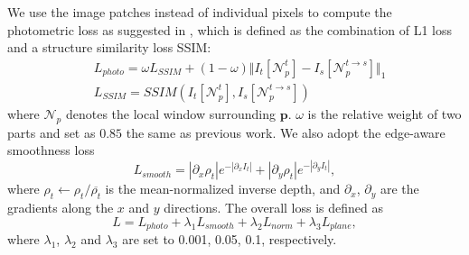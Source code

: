 \documentclass[10pt,twocolumn,letterpaper]{article}
\newcommand{\bv}[1]{{\bm {#1}}}
\newcommand{\beq}{\begin{equation}}
\newcommand{\eeq}{\end{equation}}
\begin{document}
We use the image patches instead of individual pixels to compute the photometric loss as suggested in \cite{yu2020p}, which is defined as the combination of L1 loss and a structure similarity loss SSIM\cite{SSIM}:
\beq
\begin{aligned}
	&L_{photo} = \omega L_{SSIM} + (1-\omega) \Vert I_{t}[\mathcal{N}_{p}^{t}]-I_{s}[\mathcal{N}_{p}^{t\rightarrow s}] \Vert_{1} \\
	&L_{SSIM} = SSIM(I_{t}[\mathcal{N}_{p}^{t}],I_{s}[\mathcal{N}_{p}^{t\rightarrow s}]) 
\end{aligned}
\eeq where $\mathcal{N}_{p}$ denotes the local window surrounding $\bv{p}$. $\omega$ is the relative weight of two parts and set as $0.85$ the same as previous work\cite{godard2019digging}. We also adopt the edge-aware smoothness loss
\beq
L_{smooth} = \left|\partial_x \rho_{t} \right|e^{-\left|\partial_x I_t\right|} +
\left|\partial_y \rho_{t} \right|e^{-\left|\partial_y I_t\right|},
\eeq where $\rho_{t} \leftarrow \rho_{t} / \overline{\rho_{t}}$ is the mean-normalized inverse depth, 
and $\partial_x$, $\partial_y$ are the gradients along the $x$ and $y$ directions. 
The overall loss is defined as
\beq
L = L_{photo} + \lambda_1 L_{smooth} + \lambda_2 L_{norm} + \lambda_3 L_{plane},
\eeq
where $\lambda_1$, $\lambda_2$ and $\lambda_3$ are set to 0.001, 0.05, 0.1, respectively.
\end{document}
